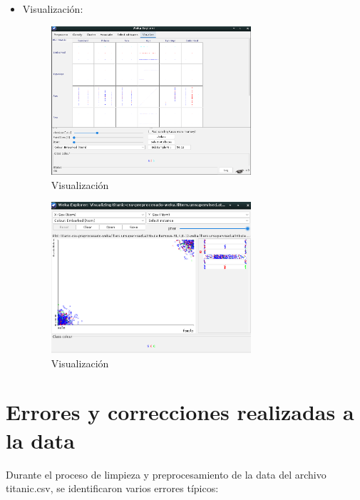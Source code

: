 \documentclass[12pt]{article}
\begin{document}
\begin{itemize}
                    \newpage
                    \item Visualización:
                        \begin{figure}[!h]
                            \centering
                            \includegraphics[width=0.7\textwidth]{img/weka-18.png}
                            \caption{Visualización}
                        \end{figure}

                        \begin{figure}[!h]
                            \centering
                            \includegraphics[width=0.7\textwidth]{img/weka-19.png}
                            \caption{Visualización}
                        \end{figure}

                \end{itemize}


    \newpage
    \section{Errores y correcciones realizadas a la data}
        Durante el proceso de limpieza y preprocesamiento de la data del archivo titanic.csv, se identificaron varios errores típicos:
\end{document}
